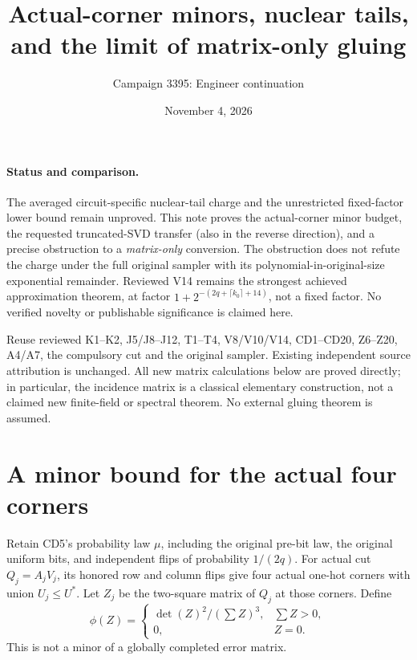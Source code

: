 \documentclass[11pt]{article}
\title{Actual-corner minors, nuclear tails, and the limit of matrix-only gluing}
\author{Campaign 3395: Engineer continuation}
\date{November 4, 2026}
\begin{document}
\maketitle

\paragraph{Status and comparison.}
The averaged circuit-specific nuclear-tail charge and the unrestricted
fixed-factor lower bound remain unproved. This note proves the actual-corner
minor budget, the requested truncated-SVD transfer (also in the reverse
direction), and a precise obstruction to a \emph{matrix-only} conversion.
The obstruction does not refute the charge under the full original sampler
with its polynomial-in-original-size exponential remainder.
Reviewed V14 remains the strongest achieved approximation theorem, at factor
$1+2^{-(2q+\lceil k_0\rceil+14)}$, not a fixed factor.
No verified novelty or publishable significance is claimed here.

Reuse reviewed K1--K2, J5/J8--J12, T1--T4, V8/V10/V14,
CD1--CD20, Z6--Z20, A4/A7, the compulsory cut and the original sampler.
Existing independent source attribution is unchanged. All new matrix
calculations below are proved directly; in particular, the incidence
matrix is a classical elementary construction, not a claimed new
finite-field or spectral theorem. No external gluing theorem is assumed.

\section{A minor bound for the actual four corners}
Retain CD5's probability law $\mu$, including the original pre-bit law,
the original uniform bits, and independent flips of probability $1/(2q)$.
For actual cut $Q_j=A_jV_j$, its honored row and column flips give
four actual one-hot corners with union $U_j\le U^*$.
Let $Z_j$ be the two-square matrix of $Q_j$ at those corners. Define
\[
 \phi(Z)=
 \begin{cases}
  \det(Z)^2/(\sum Z)^3,&\sum Z>0,\\
  0,&Z=0.
 \end{cases}                                                   \tag{RG1}
\]
This is not a minor of a globally completed error matrix.
\end{document}
